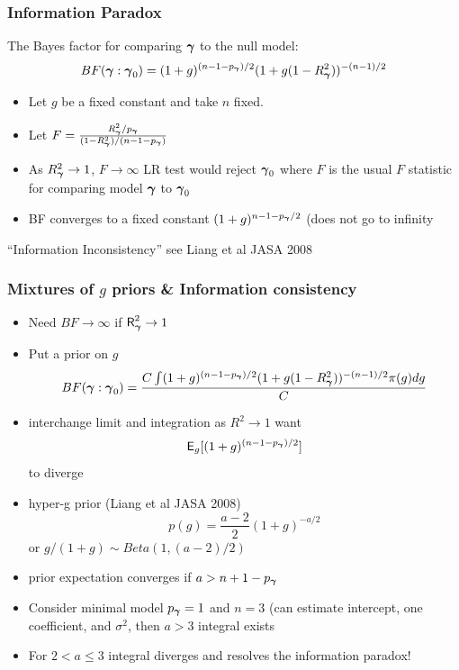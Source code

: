 \documentclass[]{beamer}
\begin{document}
\begin{frame}
  \frametitle{Information Paradox}

The Bayes factor for comparing $\boldsymbol{\gamma}$ to the null
model:
$$
 BF(\boldsymbol{\gamma} : \boldsymbol{\gamma}_0) =    (1 + g)^{(n - 1 - p_{\boldsymbol{\gamma}})/2} (1 + g(1 - R_{\boldsymbol{\gamma}}^2))^{-(n-1)/2}
$$
\pause
\begin{itemize}
\item Let $g$ be a fixed constant and take $n$ fixed. \pause
\item Let $F = \frac{R_{\boldsymbol{\gamma}}^2/p_{\boldsymbol{\gamma}}}{(1 - R_{\boldsymbol{\gamma}}^2)/(n - 1 - p_{\boldsymbol{\gamma}})}$ \pause
\item As $R^2_{\boldsymbol{\gamma}} \to 1$, $F \to \infty$ LR test would reject $\boldsymbol{\gamma}_0$
  where $F$ is the usual $F$ statistic for  comparing model $\boldsymbol{\gamma}$ to
  $\boldsymbol{\gamma}_0$ \pause
\item BF converges to a fixed constant $(1+g)^{n - 1 -p_{\boldsymbol{\gamma}}/2}$  (does not go
  to infinity 
\end{itemize}

``Information Inconsistency''  see Liang et al JASA 2008


\end{frame}


\begin{frame}
  \frametitle{Mixtures of $g$ priors \& Information consistency}


\begin{itemize}
\item Need $BF \to \infty$ if $\textsf{R}_{\boldsymbol{\gamma}}^2 \to 1$
\item Put a prior on $g$
$$BF(\boldsymbol{\gamma} : \boldsymbol{\gamma}_0) =  \frac{ C \int (1 + g)^{(n - 1 - p_{\boldsymbol{\gamma}})/2} (1 + g(1 - R_{\boldsymbol{\gamma}}^2))^{-(n-1)/2} \pi(g) dg}{C}$$
\item interchange limit and integration as $R^2 \to 1$
want
$$ \textsf{E}_g[(1 +
g)^{(n-1-p_{\boldsymbol{\gamma}})/2}]$$  to diverge

\item hyper-g prior (Liang et al JASA 2008)
$$p(g) = \frac{a-2}{2}(1 + g)^{-a/2}$$ or $g/(1+g) \sim Beta(1, (a-2)/2)$

\item prior expectation converges if $a > n + 1 - p_{\boldsymbol{\gamma}}$

\item Consider minimal model $p_{\boldsymbol{\gamma}} = 1$ and $n = 3$ (can estimate intercept, one coefficient, and  $\sigma^2$, then $a > 3$ integral exists

\item For $2 < a \le 3$ integral diverges and resolves the information paradox!
\end{itemize}

\end{frame}
\end{document}
